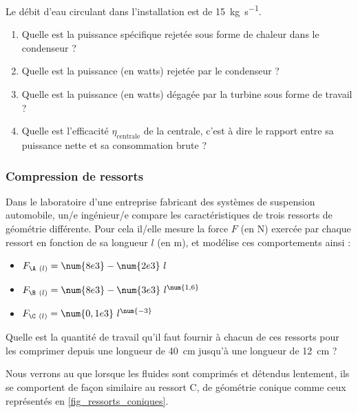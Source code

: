 	Le débit d’eau circulant dans l’installation est de \SI{15}{\kilogram\per\second}.

	\begin{enumerate}
		\item Quelle est la puissance spécifique rejetée sous forme de chaleur dans le condenseur ?
		\item Quelle est la puissance (en \si{watts}) rejetée par le condenseur ?
		\item Quelle est la puissance (en \si{watts}) dégagée par la turbine sous forme de travail ?
		\item Quelle est l’efficacité $\eta_{\text{centrale}}$ de la centrale, c’est à dire le rapport entre sa puissance nette et sa consommation brute ?
	\end{enumerate}	

\subsubsection{Compression de ressorts}
\label{exo_compression_ressorts}
	
	Dans le laboratoire d’une entreprise fabricant des systèmes de suspension automobile, un/e ingénieur/e compare les caractéristiques de trois ressorts de géométrie différente. Pour cela il/elle mesure la force $F$ (en \si{\newton}) exercée par chaque ressort en fonction de sa longueur $l$ (en \si{\metre}), et modélise ces comportements ainsi :
	
		\begin{itemize}
			\item \onlyframabook{~~}$F_{\A\ (l)} = \num{8e3} - \num{2e3} \ l$
			\item \onlyframabook{~~}$F_{\B\ (l)} = \num{8e3} - \num{3e3} \ l^{\num{1,6}}$
			\item \onlyframabook{~~}$F_{\C\ (l)} = \num{0,1e3} \ l^{\num{-3}}$
		\end{itemize}
		
	Quelle est la quantité de travail qu’il faut fournir à chacun de ces ressorts pour les comprimer depuis une longueur de \SI{40}{\centi\metre} jusqu’à une longueur de \SI{12}{\centi\metre} ?
	
	Nous verrons au \coursdeux que lorsque les fluides sont comprimés et détendus lentement, ils se comportent de façon similaire au ressort C, de géométrie conique comme ceux représentés en \cref{fig_ressorts_coniques}.
	
